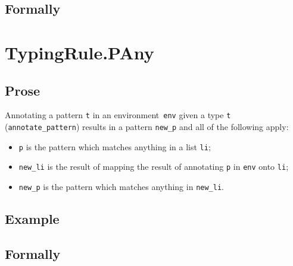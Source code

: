 \documentclass{book}
\begin{document}
\begin{itemize}

\begin{emptyformal}
    \subsection{Formally}
\end{emptyformal}


\section{TypingRule.PAny\label{sec:TypingRule.PAny}}

  \subsection{Prose}
   Annotating a pattern \texttt{t} in an environment~\texttt{env} given a type \texttt{t} (\texttt{annotate\_pattern}) results in a pattern \texttt{new\_p} and all of the following apply:
   \begin{itemize}
   \item \texttt{p} is the pattern which matches anything in a list \texttt{li};
   \item \texttt{new\_li} is the result of mapping the result of annotating \texttt{p} in \texttt{env} onto \texttt{li};
   \item \texttt{new\_p} is the pattern which matches anything in \texttt{new\_li}.
   \end{itemize}

  \subsection{Example}



\begin{emptyformal}
    \subsection{Formally}
\end{emptyformal}



\end{itemize}
\end{document}

